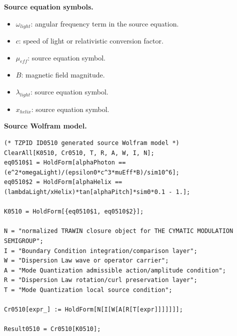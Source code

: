 \begin{minipage}[t]{0.49\linewidth}
\begingroup
\small
\raggedright
\textbf{Source equation symbols.}\par
\begin{itemize}[leftmargin=1.35em,itemsep=1pt,topsep=1pt,parsep=0pt]
    \item $\omega_{light}$: angular frequency term in the source equation.
    \item $c$: speed of light or relativistic conversion factor.
    \item $\mu_{eff}$: source equation symbol.
    \item $B$: magnetic field magnitude.
    \item $\lambda_{light}$: source equation symbol.
    \item $x_{helix}$: source equation symbol.
\end{itemize}
\endgroup
\end{minipage}\hfill
\begin{minipage}[t]{0.47\linewidth}
\begingroup
\scriptsize
\raggedright
\textbf{Source Wolfram model.}\par
\begin{Verbatim}[fontsize=\tiny,breaklines=true,breakanywhere=true]
(* TZPID ID0510 generated source Wolfram model *)
ClearAll[K0510, Cr0510, T, R, A, W, I, N];
eq0510$1 = HoldForm[alphaPhoton == (e^2*omegaLight)/(epsilon0*c^3*muEff*B)/sim10^6];
eq0510$2 = HoldForm[alphaHelix == (lambdaLight/xHelix)*tan[alphaPitch]*sim0*0.1 - 1.];

K0510 = HoldForm[{eq0510$1, eq0510$2}];

N = "normalized TRAWIN closure object for THE CYMATIC MODULATION SEMIGROUP";
I = "Boundary Condition integration/comparison layer";
W = "Dispersion Law wave or operator carrier";
A = "Mode Quantization admissible action/amplitude condition";
R = "Dispersion Law rotation/curl preservation layer";
T = "Mode Quantization local source condition";

Cr0510[expr_] := HoldForm[N[I[W[A[R[T[expr]]]]]]];

Result0510 = Cr0510[K0510];
\end{Verbatim}
\endgroup
\end{minipage}

